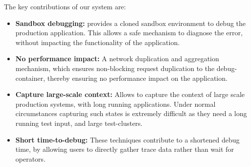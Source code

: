 \noindent
The key contributions of our system are:
\begin{itemize}[leftmargin=*,topsep=0pt,itemsep=-1ex,partopsep=1ex,parsep=1ex]
\item \textbf{Sandbox debugging:} \parikshan provides a cloned sandbox environment to debug the production application.
This allows a safe mechanism to diagnose the error, without impacting the functionality of the application.
\item \textbf{No performance impact:} A network duplication and aggregation mechanism, which ensures non-blocking request duplication to the debug-container, thereby ensuring no performance impact on the application. 
\item \textbf{Capture large-scale context:} Allows to capture the context of large scale production systems, with long running applications. Under normal circumstances capturing such states is extremely difficult as they need a long running test input, and large test-clusters.
\item \textbf{Short time-to-debug:} These techniques contribute to a shortened debug time, by allowing users to directly gather trace data rather than wait for operators. 


\end{itemize}
